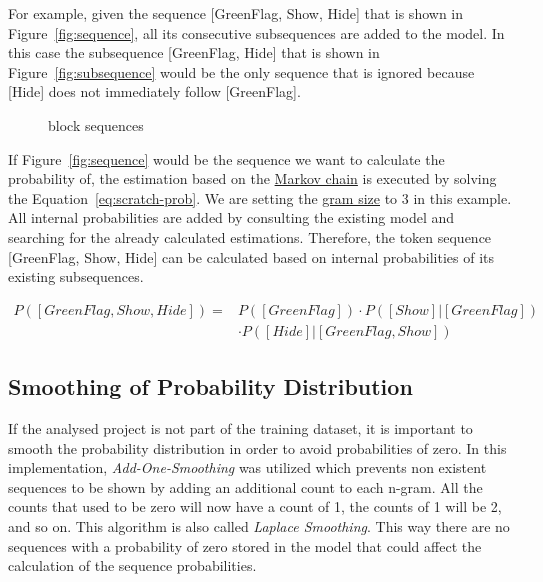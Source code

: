 For example, given the sequence [GreenFlag, Show, Hide] that is shown in Figure~\ref{fig:sequence}, all its consecutive subsequences are added to the model. In this case the subsequence [GreenFlag, Hide] that is shown in Figure~\ref{fig:subsequence} would be the only sequence that is ignored because [Hide] does not immediately follow [GreenFlag]. 

\begin{figure}%
    \centering
    \qquad
    \caption[\scratch{} block sequences]{\label{fig:sequences}\scratch{} block sequences}%
\end{figure}

If Figure~\ref{fig:sequence} would be the sequence we want to calculate the probability of, the estimation based on the \hyperref[def:markov_chain]{Markov chain} is executed by solving the Equation~\ref{eq:scratch-prob}. We are setting the \hyperref[def:gram size]{gram size} to 3 in this example. All internal probabilities are added by consulting the existing model and searching for the already calculated estimations. Therefore, the token sequence [GreenFlag, Show, Hide] can be calculated based on internal probabilities of its existing subsequences.

\begin{equation} \label{eq:scratch-prob}
\begin{aligned}
P([GreenFlag, Show, Hide]) ={} & P([GreenFlag])\cdot P([Show]|[GreenFlag]) \\
							  & \cdot P([Hide]|[GreenFlag, Show])
\end{aligned}
\end{equation}


\subsection{Smoothing of Probability Distribution}\label{subsec:smoothing}
If the analysed project is not part of the training dataset, it is important to smooth the probability distribution in order to avoid probabilities of zero. In this implementation, \textit{Add-One-Smoothing} was utilized which prevents non existent sequences to be shown by adding an additional count to each n-gram. All the counts that used to be zero will now have a count of 1, the counts of 1 will be 2, and so on. This algorithm is also called \textit{Laplace Smoothing}. This way there are no sequences with a probability of zero stored in the model that could affect the calculation of the sequence probabilities.

